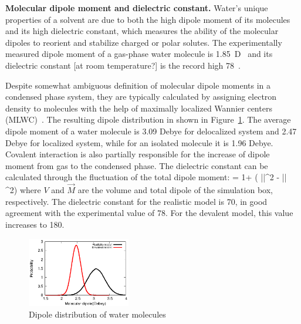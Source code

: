 \documentclass[aps,prl,reprint,amsmath,amssymb]{revtex4-1}
\begin{document}
\textbf{Molecular dipole moment and dielectric constant.} Water's unique properties of a solvent are due to both the high dipole moment of its molecules and its high dielectric constant, which measures the ability of the molecular dipoles to reorient and stabilize charged or polar solutes. The experimentally measured dipole moment of a gas-phase water molecule is 1.85~D~\cite{CRC} and its dielectric constant [at room temperature?] is the record high 78~\cite{RZK}.

 
Despite somewhat ambiguous definition of molecular dipole moments in a condensed phase system, they are typically calculated by assigning electron density to molecules with the help of maximally localized Wannier centers (MLWC)~\cite{RZK}. 
The resulting dipole distribution in shown in Figure~\ref{Fig:dipoledist}. 
The average dipole moment of a water molecule is 3.09 Debye for delocalized system and 2.47 Debye for localized system, while for an isolated molecule it is 1.96 Debye. 
\new Covalent interaction is also partially responsible for the increase of dipole moment from gas to the condensed phase. \old 
The dielectric constant can be calculated through the fluctuation of the total dipole moment\cite{neumann1983dipole,adams1981theory}:
%
\bea
\epsilon = 1+  (  \langle ||^2 \rangle  - \langle || \rangle ^2) \label{Eq:dielectric}
\eea
%
where $V$ and $\vec{M}$ are the volume and total dipole of the simulation box, respectively. 
The dielectric constant for the realistic model is 70, in good agreement with the experimental value of 78. 
For the devalent model, this value increases to 180.


\begin{figure}
\includegraphics[width=0.4\textwidth]{new_dipole}
\caption{Dipole distribution of water molecules} \label{Fig:dipoledist}
\end{figure}
\end{document}
